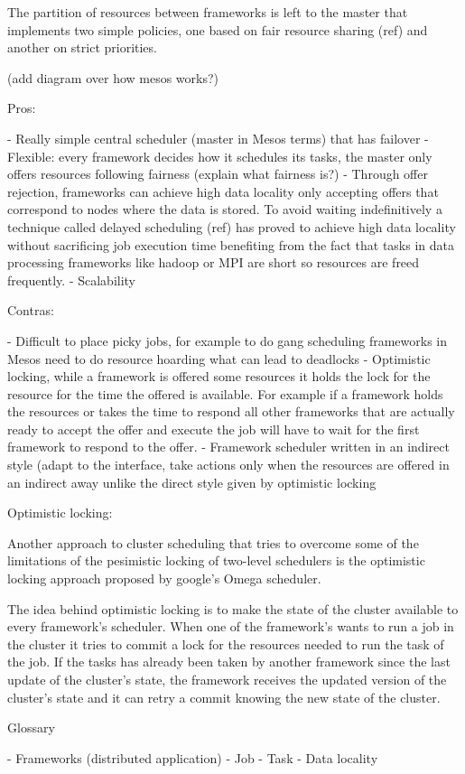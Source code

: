 The partition of resources between frameworks is left to the master
that implements two simple policies, one based on fair resource
sharing (ref) and another on strict priorities.

(add diagram over how mesos works?)


Pros:

- Really simple central scheduler (master in Mesos terms) that has
  failover 
- Flexible: every framework decides how it schedules its tasks, the
master only offers resources following fairness (explain what fairness is?)
- Through offer rejection, frameworks can achieve high data locality
only accepting offers that correspond to nodes where the data is
stored. To avoid waiting indefinitively a technique called delayed
scheduling (ref) has proved to achieve high data locality without
sacrificing job execution time benefiting from the fact that tasks in
data processing frameworks like hadoop or MPI are short so resources
are freed frequently.
- Scalability

Contras:

- Difficult to place picky jobs, for example to do gang scheduling
frameworks in Mesos need to do resource hoarding what can lead to
deadlocks
- Optimistic locking, while a framework is offered some resources it
holds the lock for the resource for the time the offered is
available. For example if a framework holds the resources or takes the
time to respond all other frameworks that are actually ready to accept
the offer and execute the job will have to wait for the first
framework to respond to the offer.
- Framework scheduler written in an indirect style (adapt to the interface, 
  take actions only when the resources are offered in an indirect away unlike
  the direct style given by optimistic locking

Optimistic locking:

Another approach to cluster scheduling that tries to overcome some of
the limitations of the pesimistic locking of two-level schedulers is
the optimistic locking approach proposed by google's Omega
scheduler.

The idea behind optimistic locking is to make the state of the cluster
available to every framework's scheduler. When one of the framework's
wants to run a job in the cluster it tries to commit a lock for the
resources needed to run the task of the job. If the tasks has already
been taken by another framework since the last update of the cluster's
state, the framework receives the updated version of the cluster's
state and it can retry a commit knowing the new state of the cluster.

Glossary

- Frameworks (distributed application)
- Job
- Task
- Data locality
